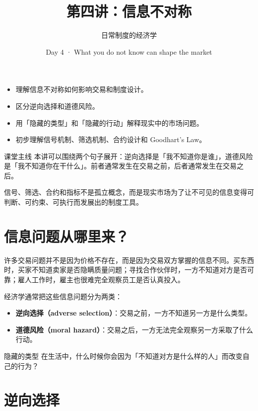 \documentclass[10pt,a4paper]{ctexart}
\title{\vspace{-2em}\bfseries 第四讲：信息不对称}
\author{日常制度的经济学}
\date{Day 4 · What you do not know can shape the market}
\begin{document}
\maketitle
\thispagestyle{fancy}

\begin{goalsbox}
\begin{itemize}
  \item 理解信息不对称如何影响交易和制度设计。
  \item 区分逆向选择和道德风险。
  \item 用「隐藏的类型」和「隐藏的行动」解释现实中的市场问题。
  \item 初步理解信号机制、筛选机制、合约设计和 Goodhart's Law。
\end{itemize}
\end{goalsbox}

\begin{keybox}{课堂主线}
本讲可以围绕两个句子展开：逆向选择是「我不知道你是谁」，道德风险是「我不知道你在干什么」。前者通常发生在交易之前，后者通常发生在交易之后。

信号、筛选、合约和指标不是孤立概念，而是现实市场为了让不可见的信息变得可判断、可约束、可执行而发展出的制度工具。
\end{keybox}

\section{信息问题从哪里来？}

许多交易问题并不是因为价格不存在，而是因为交易双方掌握的信息不同。买东西时，买家不知道卖家是否隐瞒质量问题；寻找合作伙伴时，一方不知道对方是否可靠；雇人工作时，雇主也很难完全观察员工是否认真投入。

经济学通常把这些信息问题分为两类：
\begin{itemize}
  \item \textbf{逆向选择（adverse selection）}：交易之前，一方不知道另一方是什么类型。
  \item \textbf{道德风险（moral hazard）}：交易之后，一方无法完全观察另一方采取了什么行动。
\end{itemize}

\begin{discussionbox}{隐藏的类型}
在生活中，什么时候你会因为「不知道对方是什么样的人」而改变自己的行为？
\end{discussionbox}

\section{逆向选择}
\end{document}
